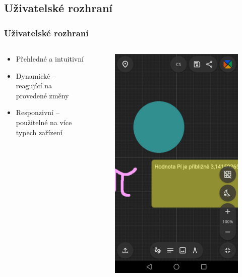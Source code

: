 \documentclass{beamer}
\begin{document}
\subsection{Uživatelské rozhraní}
\begin{frame}
    \frametitle{Uživatelské rozhraní}
    \begin{columns}[T]
        \begin{column}{.67\textwidth}
            \begin{itemize}
                \item Přehledné a intuitivní
                \item Dynamické -- reagující na provedené změny
                \item Responzivní -- použitelné na více typech zařízení
            \end{itemize}
        \end{column}
        \begin{column}{.33\textwidth}
            \begin{figure}
                \centering
    	           \includegraphics[width=1\textwidth]{Figures/PhoneVersion.jpg}

\end{figure}
\end{column}
\end{columns}
\end{frame}
\end{document}
